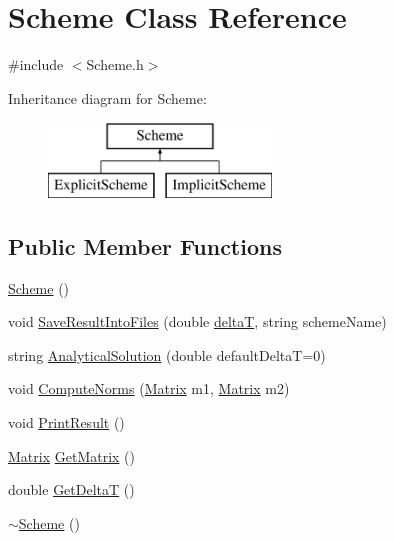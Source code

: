 \hypertarget{class_scheme}{}\section{Scheme Class Reference}
\label{class_scheme}


{\ttfamily \#include $<$Scheme.\+h$>$}

Inheritance diagram for Scheme\+:\begin{figure}[H]
\begin{center}
\leavevmode
\includegraphics[height=2.000000cm]{class_scheme}
\end{center}
\end{figure}
\subsection*{Public Member Functions}
\begin{DoxyCompactItemize}
\item 
\mbox{\hyperlink{class_scheme_aa0b319a6594176dea40ca78562401b53}{Scheme}} ()
\item 
void \mbox{\hyperlink{class_scheme_ae4512b4c8ead4d8ced95174f0b241f8a}{Save\+Result\+Into\+Files}} (double \mbox{\hyperlink{class_scheme_aaaf978f98d30bd96ea56a9387d1b2c5a}{deltaT}}, string scheme\+Name)
\item 
string \mbox{\hyperlink{class_scheme_a7d3e9f8133a955517471eb7a6fea355f}{Analytical\+Solution}} (double default\+DeltaT=0)
\item 
void \mbox{\hyperlink{class_scheme_ae098876d0287ac2bf5220608db2a8468}{Compute\+Norms}} (\mbox{\hyperlink{class_matrix}{Matrix}} m1, \mbox{\hyperlink{class_matrix}{Matrix}} m2)
\item 
void \mbox{\hyperlink{class_scheme_ae26048cf5128c6ea6e698a7036f2cc42}{Print\+Result}} ()
\item 
\mbox{\hyperlink{class_matrix}{Matrix}} \mbox{\hyperlink{class_scheme_a14c333d182a6b4e94aa2a346000257ea}{Get\+Matrix}} ()
\item 
double \mbox{\hyperlink{class_scheme_af05aa7671d5c080c0cca501cb6717cd0}{Get\+DeltaT}} ()
\item 
\mbox{\hyperlink{class_scheme_af8f283786d3b27d97c55d92b9ae8b20b}{$\sim$\+Scheme}} ()
\end{DoxyCompactItemize}
